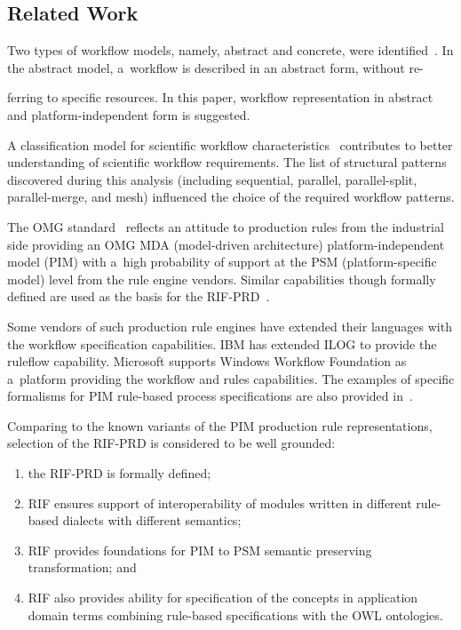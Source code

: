\begin{multicols}{2}
\vspace*{-9pt}

\section{Related Work}

  \noindent
  Two types of workflow models, namely, abstract and concrete, were
identified~\cite{15-kal}. In the abstract model, a~workflow is described in an abstract
form, without re-\linebreak\vspace*{-12pt}
\columnbreak

\noindent
ferring to specific resources. In this paper, workflow
representation in abstract and platform-independent  form is suggested.

  A classification model for scientific workflow characteristics~\cite{9-kal}
contributes to better understanding of scientific workflow requirements. The list of
structural patterns discovered during this analysis (including sequential, parallel,
parallel-split, parallel-merge, and mesh) influenced the choice of the required workflow
patterns.

  The OMG standard~\cite{16-kal} reflects an attitude to production rules from the
industrial side providing an OMG MDA (model-driven architecture)
platform-independent model (PIM)  with a~high probability of
support at the PSM (platform-specific model) level from the rule engine vendors.
Similar capabilities though formally defined are used as the basis for the
RIF-PRD~\cite{7-kal}.

  Some vendors of such production rule engines have extended their languages with
the workflow specification capabilities. IBM has extended ILOG to provide the
ruleflow capability. Microsoft supports Windows Workflow Foundation as a~platform
providing the workflow and rules capabilities. The examples of specific formalisms for
PIM rule-based process specifications are also provided in~\cite{17-kal}.

  Comparing to the known variants of the PIM production rule representations,
  selection of the RIF-PRD is considered to be well grounded:
  \begin{enumerate}[(1)]
\item the RIF-PRD is formally defined;
\item RIF ensures support of interoperability of modules written in different
rule-based dialects with different semantics;
\item RIF provides foundations for PIM to PSM semantic preserving
transformation; and
\item RIF also provides ability for specification of the concepts in application
domain terms combining rule-based specifications with the OWL ontologies.
\end{enumerate}


\end{multicols}
